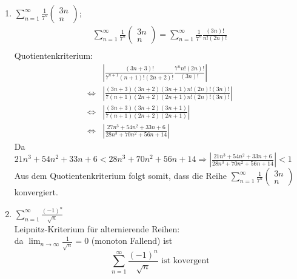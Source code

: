 \documentclass{HM}
\begin{document}
\begin{enumerate}
\begin{enumerate}
\item $\sum\limits_{n=1}^\infty\frac{1}{7^n}\begin{pmatrix}
3n\\
n
\end{pmatrix}$;\\
\begin{align*}
	\sum\limits_{n=1}^\infty\frac{1}{7^n}
	\begin{pmatrix}
		3n\\
		n
	\end{pmatrix}
	=\sum\limits_{n=1}^\infty\frac{1}{7^n} \frac{(3n)!}{n!(2n)!}\\
\end{align*}
Quotientenkriterium:
\begin{align*}
	&\left|\frac{(3n+3)!}{7^{n+1}(n+1)!(2n+2)!}\frac{7^nn!(2n)!}{(3n)!}\right|\\
	\Leftrightarrow &\left|\frac{(3n+3)(3n+2)(3n+1)n!(2n)!(3n)!}{7(n+1)(2n+2)(2n+1)n!(2n)!(3n)!}\right|\\
	\Leftrightarrow &\left|\frac{(3n+3)(3n+2)(3n+1)}{7(n+1)(2n+2)(2n+1)}\right|\\
	\Leftrightarrow &\left|\frac{27n^3+54n^2+33n+6}{28n^3+70n^2+56n+14}\right|
	\end{align*}
	Da $21n^3+54n^2+33n+6<28n^3+70n^2+56n+14 \Rightarrow \left|\frac{21n^3+54n^2+33n+6}{28n^3+70n^2+56n+14}\right|<1$
\\
Aus dem Quotientenkriterium folgt somit, dass die Reihe $\sum\limits_{n=1}^\infty\frac{1}{7^n}\begin{pmatrix}
3n\\
n
\end{pmatrix}$ konvergiert.
\item $\sum\limits_{n=1}^\infty\frac{(-1)^n}{\sqrt{n}}$\\
Leipnitz-Kriterium für alternierende Reihen:\\
da $\lim_{n\to\infty} \frac{1}{\sqrt{n}} = 0$ (monoton Fallend) ist $$\sum\limits_{n=1}^\infty\frac{(-1)^n}{\sqrt{n}}\text{ ist kovergent}$$ 

\end{enumerate}

\end{enumerate}
\end{document}
